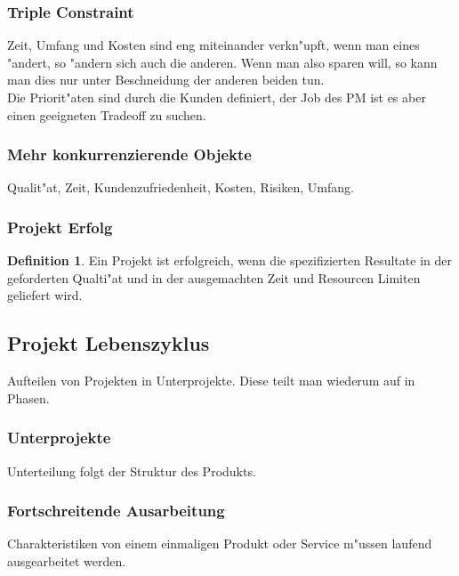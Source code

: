 \documentclass[german, 10pt, a4paper, twocolumn]{scrartcl}
\theoremstyle{definition}
\newtheorem*{definition}{Definition}
\begin{document}
\subsubsection{Triple Constraint}

Zeit, Umfang und Kosten sind eng miteinander verkn"upft, wenn man eines "andert, so "andern sich auch die anderen. Wenn man also sparen will, so kann man dies nur unter Beschneidung der anderen beiden tun.\\

Die Priorit"aten sind durch die Kunden definiert, der Job des PM ist es aber einen geeigneten Tradeoff zu suchen.

\subsubsection{Mehr konkurrenzierende Objekte}

Qualit"at, Zeit, Kundenzufriedenheit, Kosten, Risiken, Umfang.

\subsubsection{Projekt Erfolg}

\begin{definition}
	Ein Projekt ist erfolgreich, wenn die spezifizierten Resultate in der geforderten Qualti"at und in der ausgemachten Zeit und Resourcen Limiten geliefert wird.
\end{definition}

\subsection{Projekt Lebenszyklus}

Aufteilen von Projekten in Unterprojekte. Diese teilt man wiederum auf in Phasen.

\subsubsection{Unterprojekte}

Unterteilung folgt der Struktur des Produkts.

\subsubsection{Fortschreitende Ausarbeitung}

Charakteristiken von einem einmaligen Produkt oder Service m"ussen laufend ausgearbeitet werden.
\end{document}
